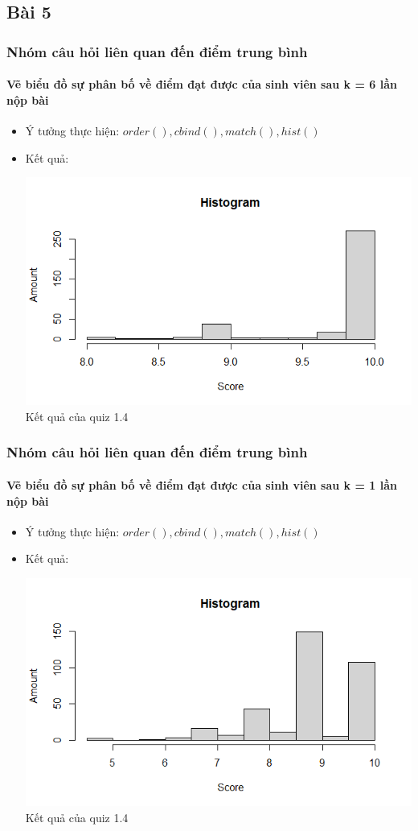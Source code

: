 \documentclass[english,10pt,table]{beamer}
\begin{document}
\subsection{Bài 5}

\frame
{
\frametitle{Nhóm câu hỏi liên quan đến điểm trung bình}
\framesubtitle{Vẽ biểu đồ sự phân bố về điểm đạt được của sinh viên sau k = 6 lần nộp bài}
\begin{itemize}
    \item Ý tưởng thực hiện: $order(), cbind(), match(), hist()$
    \item Kết quả:\\
    \begin{center}
        \includegraphics[width = 6 cm]{Images/img5-1-1.png}\\
        Kết quả của quiz 1.4
    \end{center}
\end{itemize}
}

\frame
{
\frametitle{Nhóm câu hỏi liên quan đến điểm trung bình}
\framesubtitle{Vẽ biểu đồ sự phân bố về điểm đạt được của sinh viên sau k = 1 lần nộp bài}
\begin{itemize}
    \item Ý tưởng thực hiện: $order(), cbind(), match(), hist()$
    \item Kết quả:\\
    \begin{center}
        \includegraphics[width = 6 cm]{Images/img5-2-1.png}\\
        Kết quả của quiz 1.4
    \end{center}
\end{itemize}
}
\end{document}

